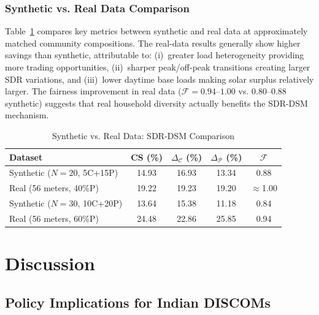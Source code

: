 \documentclass[pdflatex,sn-mathphys-num]{sn-jnl}
\theoremstyle{thmstyleone}
\theoremstyle{thmstyletwo}
\begin{document}
\subsubsection{Synthetic vs. Real Data Comparison}

Table~\ref{tab:comparison} compares key metrics between synthetic and real data at approximately matched community compositions. The real-data results generally show higher savings than synthetic, attributable to: (i)~greater load heterogeneity providing more trading opportunities, (ii)~sharper peak/off-peak transitions creating larger SDR variations, and (iii)~lower daytime base loads making solar surplus relatively larger. The fairness improvement in real data ($\mathcal{F} = 0.94$--$1.00$ vs. $0.80$--$0.88$ synthetic) suggests that real household diversity actually benefits the SDR-DSM mechanism.

\begin{table}[t]
\caption{Synthetic vs. Real Data: SDR-DSM Comparison}
\label{tab:comparison}
\centering
\footnotesize
\begin{tabular}{lcccc}
\toprule
\textbf{Dataset} & \textbf{CS (\%)} & $\Delta_{\mathcal{C}}$ (\%) & $\Delta_{\mathcal{P}}$ (\%) & $\mathcal{F}$ \\
\midrule
Synthetic ($N=20$, 5C+15P) & 14.93 & 16.93 & 13.34 & 0.88 \\
Real (56 meters, 40\%P) & 19.22 & 19.23 & 19.20 & $\approx$1.00 \\
\midrule
Synthetic ($N=30$, 10C+20P) & 13.64 & 15.38 & 11.18 & 0.84 \\
Real (56 meters, 60\%P) & 24.48 & 22.86 & 25.85 & 0.94 \\
\bottomrule
\end{tabular}
\end{table}

\section{Discussion}\label{sec:discussion}

\subsection{Policy Implications for Indian DISCOMs}
\end{document}
